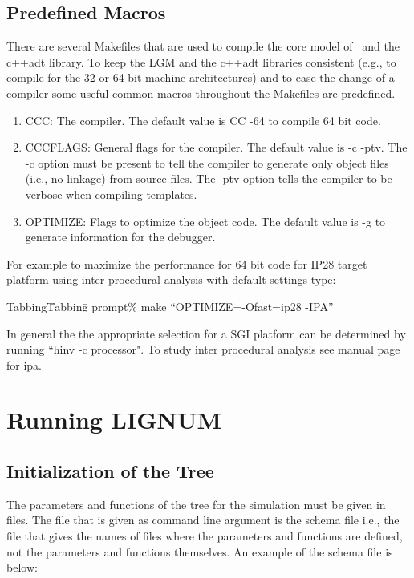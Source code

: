 \subsection{Predefined Macros}

There are several Makefiles that are used to compile the core model of
\lignum\  and the  c++adt library.   To keep  the LGM  and  the c++adt
libraries consistent  (e.g., to compile for  the 32 or  64 bit machine
architectures) and to ease the change of a compiler some useful common
macros throughout the Makefiles are predefined.

\begin{enumerate}
\item CCC: The compiler. The default value is CC -64 to compile 64 bit code.
\item CCCFLAGS: General flags for the compiler. The default value is 
 -c  -ptv. The  -c option  must  be present  to tell  the compiler  to
  generate  only object files  (i.e., no  linkage) from  source files.
  The  -ptv option  tells the  compiler to  be verbose  when compiling
  templates.
\item OPTIMIZE: Flags to optimize the object code. The default value
is -g to generate information for the debugger.
\end{enumerate}
For example to maximize the performance for 64 bit code for IP28
target platform using inter procedural analysis with default settings type:
\begin{tabbing}
Tabbing\= Tabbing\=\kill 
\>\>prompt\% make ``OPTIMIZE=-Ofast=ip28 -IPA''
\end{tabbing}

In general  the the  appropriate selection for  a SGI platform  can be
determined by running  ``hinv -c processor". To study inter procedural
analysis see manual page for ipa.


\section{Running LIGNUM}

\subsection{Initialization of the Tree}

The parameters and functions of the tree for the simulation 
must be given in files. The file that is given as command 
line argument is the schema file i.e., the file that gives the 
names of files where the parameters and functions are defined, 
not the parameters and functions themselves. An example of the schema file
is below:


